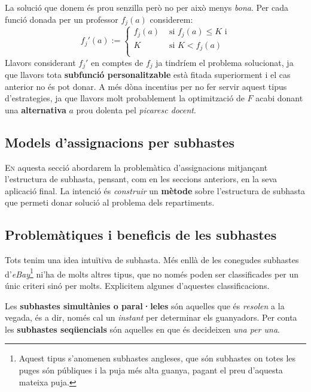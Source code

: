 \documentclass[10pt,twocolumn]{article}
\newcommand{\esp}{\text{ }}
\begin{document}
La solució que donem és prou senzilla però no per això menys \textit{bona}. Per cada funció donada per un professor $f_j(a)$ considerem:
$$
f_j'(a):=
\begin{cases}
f_j(a) &\text{ si } f_j(a)\leq K \text{ i}\\
K &\text{ si } K<f_j(a)\\
\end{cases}
$$
Llavors considerant $f_j'$ en comptes de $f_j$ ja tindríem el problema solucionat, ja que llavors tota \textbf{subfunció personalitzable} està fitada superiorment i el cas anterior no és pot donar. A més dòna incentius per no fer servir aquest tipus d'estrategies, ja que llavors molt probablement la optimització de $F$ acabi donant una \textbf{alternativa} $a$ prou dolenta pel \textit{picaresc docent}.
\newpage
$$
\esp
$$
\newpage
\begin{tcolorbox}[colframe=white,colback=redviolet!20,sharp corners=all,size=minimal,halign=center,valign=center]
	\section{Models d'assignacions per subhastes}
\end{tcolorbox}
\lettrine{E}n aquesta secció abordarem la problemàtica d'assignacions mitjançant l'estructura de subhasta, pensant, com en les seccions anteriors, en la seva aplicació final. La intenció  és \textit{construir} un \textbf{mètode} sobre l'estructura de subhasta que permeti  donar solució al problema dels repartiments.
\subsection{Problemàtiques i beneficis de les subhastes}
Tots tenim una idea intuïtiva de subhasta. Més enllà de les conegudes subhastes d'\textit{eBay}\footnote{Aquest tipus s'anomenen subhastes angleses, que són subhastes on totes les puges són públiques i la puja més alta guanya, pagant el preu d'aquesta mateixa puja. }  ni'ha de molts altres tipus, que no només poden ser classificades per un únic criteri sinó per molts. Explicitem algunes d'aquestes classificacions.

Les \textbf{subhastes simultànies o paral·leles} són aquelles que és \textit{resolen} a la vegada, és a dir, només cal un \textit{instant} per determinar els guanyadors. Per conta les \textbf{subhastes seqüencials } són aquelles en que és decideixen \textit{una per una}. 
\end{document}
